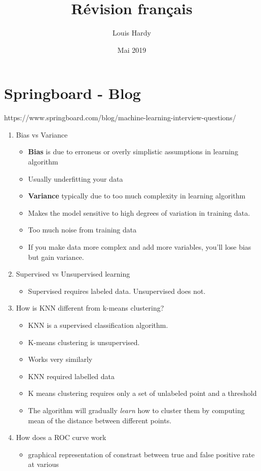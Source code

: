 \documentclass[12pt,a4paper]{article}
\title{Révision français}
\author{Louis Hardy}
\date{Mai 2019}
\begin{document}
\section*{Springboard - Blog}
https://www.springboard.com/blog/machine-learning-interview-questions/ \\
\begin{enumerate}
   \item Bias vs Variance
   \begin{itemize}
     \item \textbf{Bias} is due to erroneus or overly simplistic assumptions in learning algorithm
     \item Usually underfitting your data
     \item \textbf{Variance} typically due to too much complexity in learning algorithm
     \item Makes the model sensitive to high degrees of variation in training data. 
     \item Too much noise from training data
     \item If you make data more complex and add more variables, you'll lose bias but gain variance. 
   \end{itemize}
   \item Supervised vs Unsupervised learning
   \begin{itemize}
       \item Supervised requires labeled data. Unsupervised does not. 
    \end{itemize}
    \item How is KNN different from k-means clustering?
    \begin{itemize}
        \item KNN is a supervised classification algorithm. 
        \item K-means clustering is unsupervised. 
        \item Works very similarly
        \item KNN required labelled data 
        \item K means clustering requires only a set of unlabeled point and a threshold
        \item The algorithm will gradually \textit{learn} how to cluster them by computing mean of the 
              distance between different points.
    \end{itemize}
    \item How does a ROC curve work
    \begin{itemize}
      \item graphical representation of constrast between true and false positive rate at various 

\end{itemize}
\end{enumerate}
\end{document}
